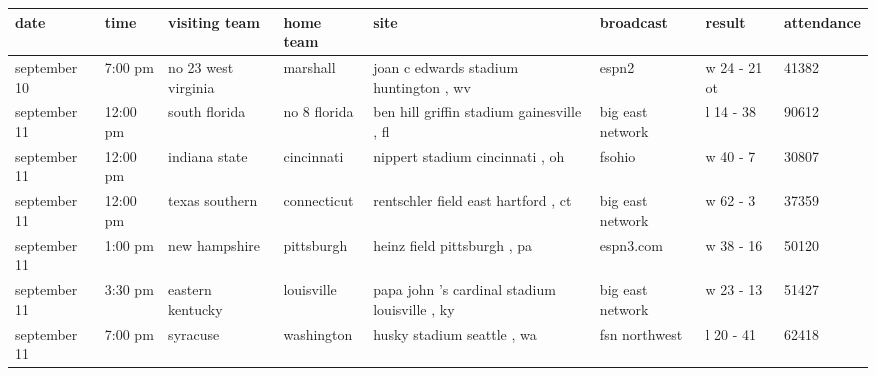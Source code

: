 \documentclass{article}
\begin{document}
\begin{tabular}{llllllll}
\toprule
date & time & visiting team & home team & site & broadcast & result & attendance \\
\midrule
september 10 & 7:00 pm & no 23 west virginia & marshall & joan c edwards stadium huntington , wv & espn2 & w 24 - 21 ot & 41382 \\
september 11 & 12:00 pm & south florida & no 8 florida & ben hill griffin stadium gainesville , fl & big east network & l 14 - 38 & 90612 \\
september 11 & 12:00 pm & indiana state & cincinnati & nippert stadium cincinnati , oh & fsohio & w 40 - 7 & 30807 \\
september 11 & 12:00 pm & texas southern & connecticut & rentschler field east hartford , ct & big east network & w 62 - 3 & 37359 \\
september 11 & 1:00 pm & new hampshire & pittsburgh & heinz field pittsburgh , pa & espn3.com & w 38 - 16 & 50120 \\
september 11 & 3:30 pm & eastern kentucky & louisville & papa john 's cardinal stadium louisville , ky & big east network & w 23 - 13 & 51427 \\
september 11 & 7:00 pm & syracuse & washington & husky stadium seattle , wa & fsn northwest & l 20 - 41 & 62418 \\
\bottomrule
\end{tabular}
\end{document}
